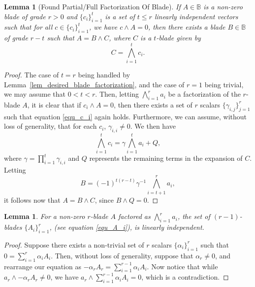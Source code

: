 \documentclass{birkjour}
\newtheorem{lem}[thm]{Lemma}
\theoremstyle{definition}
\theoremstyle{remark}
\numberwithin{equation}{section}
\newcommand{\B}{\mathbb{B}}
\begin{document}
\begin{lem}[Found Partial/Full Factorization Of Blade]\label{lem_desired_partial_blade_factorization}
If $A\in\B$ is a non-zero blade of grade $r>0$ and $\{c_i\}_{i=1}^t$ is a set of $t\leq r$ linearly
independent vectors such that for all $c\in\{c_i\}_{i=1}^t$, we have $c\wedge A=0$, then there
exists a blade $B\in\B$ of grade $r-t$ such that $A=B\wedge C$, where $C$ is a $t$-blade given by
\begin{equation}
C = \bigwedge_{i=1}^t c_i.
\end{equation}
\end{lem}
\begin{proof}
The case of $t=r$ being handled by Lemma~\ref{lem_desired_blade_factorization}, and the
case of $r=1$ being trivial, we may assume that $0<t<r$.  Then, letting $\bigwedge_{i=1}^r a_i$
be a factorization of the $r$-blade $A$, it is clear that if $c_i\wedge A=0$, then there exists a
set of $r$ scalars $\{\gamma_{i,j}\}_{j=1}^r$ such that equation \eqref{equ_c_i} again holds.
Furthermore, we can assume, without loss of generality, that for each $c_i$, $\gamma_{i,i}\neq 0$.
We then have
\begin{equation}
\bigwedge_{i=1}^t c_i = \gamma\bigwedge_{i=1}^t a_i + Q,
\end{equation}
where $\gamma=\prod_{i=1}^t\gamma_{i,i}$ and $Q$ represents the remaining terms in the
expansion of $C$.  Letting
\begin{equation}
B=(-1)^{t(r-t)}\gamma^{-1}\bigwedge_{i=t+1}^r a_i,
\end{equation}
it follows now that $A=B\wedge C$, since $B\wedge Q=0$.
\end{proof}


\begin{lem}\label{lem_lin_indep_blades}
For a non-zero $r$-blade $A$ factored as $\bigwedge_{i=1}^r a_i$, the set of
$(r-1)$-blades $\{A_i\}_{i=1}^r$, (see equation \eqref{equ_A_i}), is linearly independent.
\end{lem}
\begin{proof}
Suppose there exists a non-trivial set of $r$ scalars $\{\alpha_i\}_{i=1}^r$
such that $0 = \sum_{i=1}^r\alpha_i A_i$.
Then, without loss of generality, suppose that $\alpha_r\neq 0$, and rearrange
our equation as $-\alpha_rA_r=\sum_{i=1}^{r-1}\alpha_iA_i$.  Now notice
that while $a_r\wedge-\alpha_rA_r\neq 0$, we have $a_r\wedge\sum_{i=1}^{r-1}\alpha_iA_i=0$,
which is a contradiction.
\end{proof}
\end{document}
